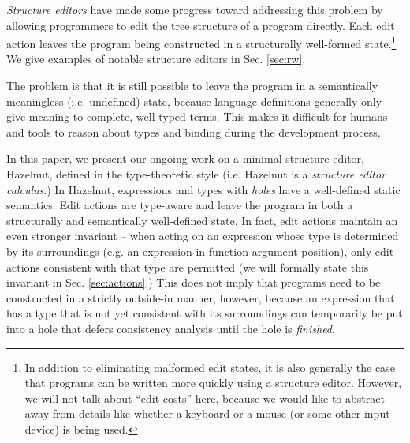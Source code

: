 

\emph{Structure editors} have made some progress toward addressing this
problem by allowing programmers to edit the tree structure of a program
directly. Each edit action leaves the program being constructed in a
structurally well-formed state.\footnote{In addition to eliminating malformed edit states, it is also generally the case that programs can be written more quickly using a structure editor. However, we will not talk about ``edit costs'' here, because we would like to abstract away from details like whether a keyboard or a mouse (or some other input device) is being used.} We give examples of notable structure editors in Sec. \ref{sec:rw}.  

The problem is that it is still possible to leave the program in a semantically meaningless (i.e. undefined) state, because language definitions generally only give meaning to complete, well-typed terms. This makes it difficult for humans and tools to reason about types and binding during the development process.  %


In this paper, we present our ongoing work on a minimal structure editor, Hazelnut,  defined in the type-theoretic style (i.e. Hazelnut is a \emph{structure editor calculus}.) In Hazelnut, expressions and types with \emph{holes} have a well-defined static semantics. Edit actions are type-aware and leave the program in both a structurally and semantically well-defined state. In fact, edit actions maintain an even stronger invariant -- when acting on an expression whose type is determined by its surroundings (e.g. an expression in function argument position), only edit actions consistent with that type are permitted (we will formally state this invariant in Sec. \ref{sec:actions}.) This does not imply that programs need to be constructed in a strictly outside-in manner, however, because an expression that has a type that is not yet consistent with its surroundings can temporarily be put into a {hole} that defers consistency analysis until the hole is \emph{finished}.

